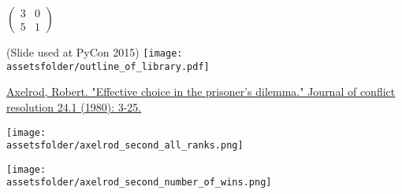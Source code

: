 \documentclass{beamer}
\newcommand{\assetsfolder}{./assets}
\begin{document}
	\begin{frame}
		\fontsize{74}{65}\selectfont
		\begin{center}
			\(
				\begin{pmatrix}
					3 & 0\\
					5 & 1
				\end{pmatrix}
			\)
		\end{center}

	\end{frame}


    \begin{frame}
		\begin{center}
            (Slide used at PyCon 2015)
			\texttt{[image: \\assetsfolder/outline\_of\_library.pdf]}
		\end{center}
    \end{frame}

    \begin{frame}
    \begin{center}
        \href{https://journals.sagepub.com/doi/abs/10.1177/002200278002400101}{Axelrod, Robert. "Effective choice in the prisoner's dilemma." Journal of conflict resolution 24.1 (1980): 3-25.}
        \end{center}

    \end{frame}

    \begin{frame}
		\begin{center}
            \texttt{[image: \\assetsfolder/axelrod\_second\_all\_ranks.png]}
		\end{center}
    \end{frame}

    \begin{frame}
		\begin{center}
            \texttt{[image: \\assetsfolder/axelrod\_second\_number\_of\_wins.png]}
		\end{center}
    \end{frame}
\end{document}

